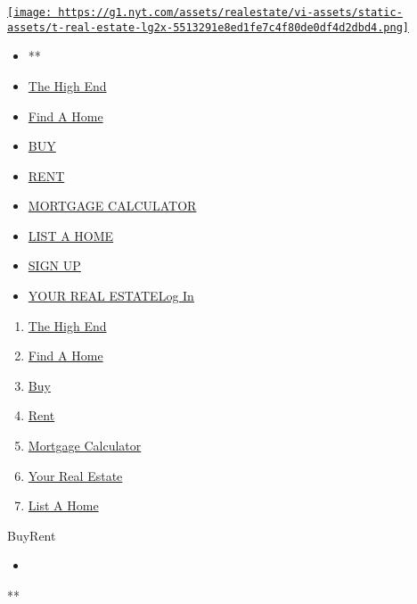 \href{/section/realestate}{\texttt{[image: https://g1.nyt.com/assets/realestate/vi-assets/static-assets/t-real-estate-lg2x-5513291e8ed1fe7c4f80de0df4d2dbd4.png]}}

\begin{itemize}
\tightlist
\item
  **
\item
  \href{/real-estate/the-high-end}{The High End}
\item
  \href{/real-estate/find-a-home}{Find A Home}
\item
  \href{/real-estate/homes-for-sale}{BUY}
\item
  \href{/real-estate/homes-for-rent}{RENT}
\item
  \href{/real-estate/mortgage-calculator}{MORTGAGE CALCULATOR}
\item
  \href{https://nytimesads.gtspayments.com}{LIST A HOME}
\item
  \href{https://myaccount.nytimes.com/auth/register?client_id=real.estate.ui\&display=control\&redirect_uri=\%2Freal-estate\%2Fhomes-for-sale\%3F\&response_type=cookie}{SIGN
  UP}
\item
  \href{https://myaccount.nytimes.com/auth/login?client_id=real.estate.ui\&display=control\&redirect_uri=\%2Freal-estate\%2Fhomes-for-sale\%3F\&response_type=cookie}{YOUR
  REAL ESTATELog In}
\end{itemize}

\begin{enumerate}
\def\labelenumi{\arabic{enumi}.}
\tightlist
\item
  \href{/real-estate/the-high-end}{The High End}
\item
  \href{/real-estate/find-a-home}{Find A Home}
\item
  \href{/real-estate/homes-for-sale}{Buy}
\item
  \href{/real-estate/homes-for-rent}{Rent}
\item
  \href{/real-estate/mortgage-calculator}{Mortgage Calculator}
\item
  \href{/real-estate/my-real-estate}{Your Real Estate}
\item
  \href{https://nytimesads.gtspayments.com/}{List A Home}
\end{enumerate}

BuyRent

\begin{itemize}
\item
\end{itemize}

**

